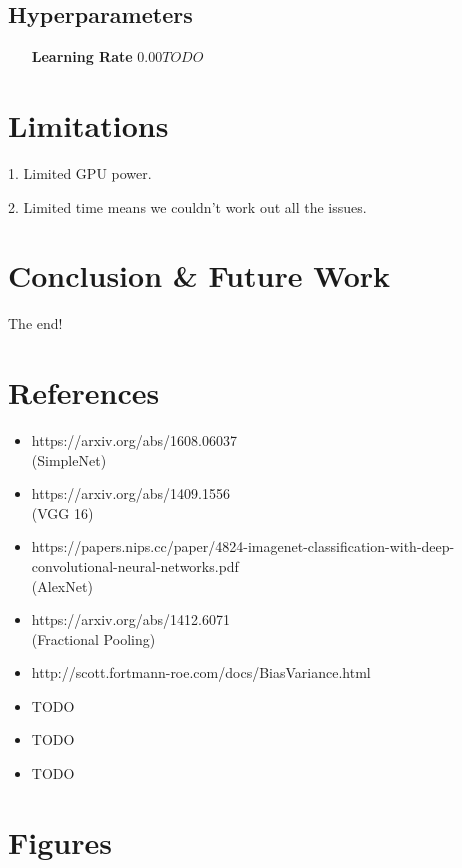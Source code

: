 \documentclass[10pt]{article} %
\begin{document}
	\subsection{Hyperparameters}
	
	\begin{itemize}
		\item[\textbf{Learning Rate}] $0.00TODO$
	\end{itemize}
	
	\section{Limitations}
	
	1. Limited GPU power.
	
	2. Limited time means we couldn't work out all the issues.
	
	\section{Conclusion \& Future Work}
	
	The end!
	
	\section{References}
	\begin{itemize}
		\item https://arxiv.org/abs/1608.06037 \\ (SimpleNet)
		\item https://arxiv.org/abs/1409.1556 \\ (VGG 16)
		\item https://papers.nips.cc/paper/4824-imagenet-classification-with-deep-convolutional-neural-networks.pdf \\ (AlexNet)
		\item https://arxiv.org/abs/1412.6071 \\ (Fractional Pooling)
		\item http://scott.fortmann-roe.com/docs/BiasVariance.html
		\item TODO
		\item TODO
		\item TODO
	\end{itemize}
	
	\section{Figures}
	
\end{document}
